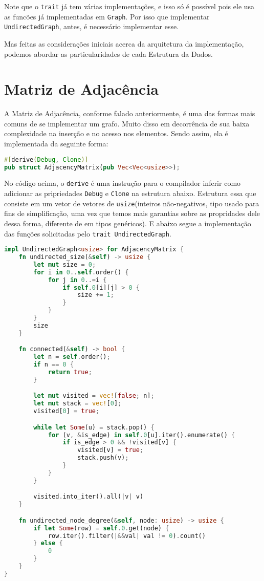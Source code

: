 Note que o \texttt{trait} já tem várias implementações, e isso só é possível pois ele usa as funcões já implementadas em \texttt{Graph}. Por isso que implementar \texttt{UndirectedGraph}, antes, é necessário implementar esse.

Mas feitas as considerações iniciais acerca da arquitetura da implementação, podemos abordar as particularidades de cada Estrutura da Dados.

\section{Matriz de Adjacência}

A Matriz de Adjacência, conforme falado anteriormente, é uma das formas mais comuns de se implementar um grafo. Muito disso em decorrência de sua baixa complexidade na inserção e no acesso nos elementos. Sendo assim, ela é implementada da seguinte forma:

\begin{lstlisting}[language=Rust, caption={Implementação da Estrutura de Dados Matriz de Adjacência}, label=list:struct_adj_mat]
#[derive(Debug, Clone)]
pub struct AdjacencyMatrix(pub Vec<Vec<usize>>);
\end{lstlisting}

No código acima, o \texttt{derive} é uma instrução para o compilador inferir como adicionar as pripriedades \texttt{Debug} e \texttt{Clone} na estrutura abaixo. Estrutura essa que consiste em um vetor de vetores de \texttt{usize}(inteiros não-negativos, tipo usado para fins de simplificação, uma vez que temos mais garantias sobre as propridades dele dessa forma, diferente de em tipos genéricos). E abaixo segue a implementação das funções solicitadas pelo \texttt{trait UndirectedGraph}.

\begin{lstlisting}[language=Rust, caption={Implementação de UndirectedGraph na Estrutura de Dados Matriz de Adjacência}, label=list:impl_adj_mat_ug] impl UndirectedGraph<usize> for AdjacencyMatrix {
    fn undirected_size(&self) -> usize {
        let mut size = 0;
        for i in 0..self.order() {
            for j in 0..=i {
                if self.0[i][j] > 0 {
                    size += 1;
                }
            }
        }
        size
    }

    fn connected(&self) -> bool {
        let n = self.order();
        if n == 0 {
            return true;
        }

        let mut visited = vec![false; n];
        let mut stack = vec![0];
        visited[0] = true;

        while let Some(u) = stack.pop() {
            for (v, &is_edge) in self.0[u].iter().enumerate() {
                if is_edge > 0 && !visited[v] {
                    visited[v] = true;
                    stack.push(v);
                }
            }
        }

        visited.into_iter().all(|v| v)
    }

    fn undirected_node_degree(&self, node: usize) -> usize {
        if let Some(row) = self.0.get(node) {
            row.iter().filter(|&&val| val != 0).count()
        } else {
            0
        }
    }
}
\end{lstlisting}

